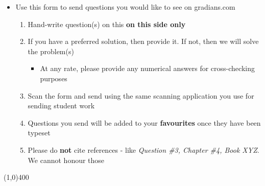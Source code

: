 \documentclass[12pt,a4paper,justified]{tufte-exam}
\begin{document}
  \begin{fullwidth}
    \begin{itemize}
      \item Use this form to send questions you would like to see on gradians.com
      \begin{enumerate}
        \item Hand-write question(s) on this \textbf{on this side only} 
        \item If you have a preferred solution, then provide it. If not, then we will solve the problem(s)
        \begin{itemize}
          \item At any rate, please provide any numerical answers for cross-checking purposes
        \end{itemize}
        \item Scan the form and send using the same scanning application you use for sending student work
        \item Questions you send will be added to your \textbf{favourites} once they have been typeset
        \item Please do \textbf{not} cite references - like \textit{Question \#3, Chapter \#4, Book XYZ}.
              We cannot honour those
      \end{enumerate}
    \end{itemize}
    \line(1,0){400}
  \end{fullwidth}
\end{document}

